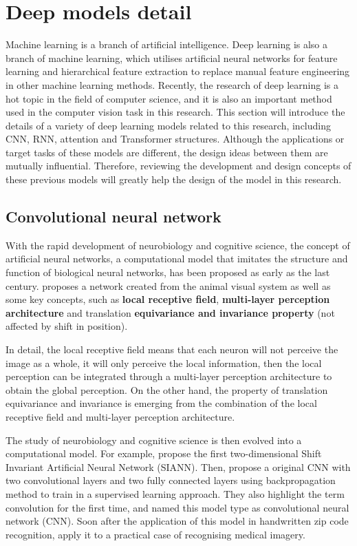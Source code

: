 \section{Deep models detail}
\label{sec:Deep models detail}
Machine learning is a branch of artificial intelligence. Deep learning is also a branch of machine learning, which utilises artificial neural networks for feature learning and hierarchical feature extraction to replace manual feature engineering in other machine learning methods.
Recently, the research of deep learning is a hot topic in the field of computer science, and it is also an important method used in the computer vision task in this research.
This section will introduce the details of a variety of deep learning models related to this research, including CNN, RNN, attention and Transformer structures.
Although the applications or target tasks of these models are different, the design ideas between them are mutually influential.
Therefore, reviewing the development and design concepts of these previous models will greatly help the design of the model in this research.
\subsection{Convolutional neural network}
With the rapid development of neurobiology and cognitive science, the concept of artificial neural networks, a computational model that imitates the structure and function of biological neural networks, has been proposed as early as the last century.
\citet{fukushima1980neocognitron} proposes a network created from the animal visual system as well as some key concepts, such as \textbf{local receptive field}, \textbf{multi-layer perception architecture} and translation \textbf{equivariance and invariance property} (not affected by shift in position).

In detail, the local receptive field means that each neuron will not perceive the image as a whole, it will only perceive the local information, then the local perception can be integrated through a multi-layer perception architecture to obtain the global perception.
On the other hand, the property of translation equivariance and invariance is emerging from the combination of the local receptive field and multi-layer perception architecture.

The study of neurobiology and cognitive science is then evolved into a computational model. For example, \citet{zhang1988shift} propose the first two-dimensional Shift Invariant Artificial Neural Network (SIANN).
Then, \citet{lecun1989backpropagation} propose a original CNN with two convolutional layers and two fully connected layers using backpropagation method to train in a supervised learning approach.
They also highlight the term convolution for the first time, and named this model type as convolutional neural network (CNN).
Soon after the application of this model in handwritten zip code recognition, \citet{zhang1994computerized} apply it to a practical case of recognising medical imagery.

